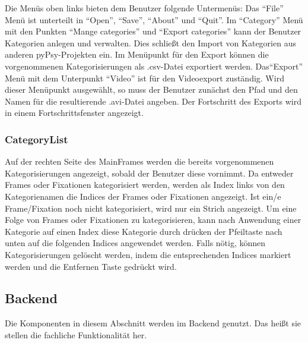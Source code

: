 \documentclass[a4paper,draft]{scrartcl}
\begin{document}
Die Menüs oben links bieten dem Benutzer folgende Untermenüs:
Das "`File"' Menü ist unterteilt in "`Open"', "`Save"', "`About"' und "`Quit"'. 
Im "`Category"' Menü mit den Punkten "`Mange categories"' und "`Export categories"' kann der Benutzer Kategorien anlegen und verwalten. Dies schließt den Import von Kategorien aus anderen pyPsy-Projekten ein.
Im Menüpunkt für den Export können die vorgenommenen Kategorisierungen als .csv-Datei exportiert werden. 
Das"`Export"' Menü mit dem Unterpunkt "`Video"' ist für den Videoexport zuständig. Wird dieser Menüpunkt ausgewählt, so muss der Benutzer zunächst den Pfad und den Namen für die resultierende .avi-Datei angeben. Der Fortschritt des Exports wird in einem Fortschrittsfenster angezeigt.


\subsubsection{CategoryList}
Auf der rechten Seite des MainFrames werden die bereits vorgenommenen Kategorisierungen angezeigt, sobald der Benutzer diese vornimmt. 
Da entweder Frames oder Fixationen kategorisiert werden, werden als Index links von den Kategorienamen die Indices der Frames oder Fixationen angezeigt. Ist ein/e Frame/Fixation noch nicht kategorisiert, wird nur ein Strich angezeigt.
Um eine Folge von Frames oder Fixationen zu kategorisieren, kann nach Anwendung einer Kategorie auf einen Index diese Kategorie durch drücken der Pfeiltaste nach unten auf die folgenden Indices angewendet werden.
Falls nötig, können Kategorisierungen gelöscht werden, indem die entsprechenden Indices markiert werden und die Entfernen Taste gedrückt wird. 

\subsection{Backend}
Die Komponenten in diesem Abschnitt werden im Backend genutzt.
Das hei\ss t sie stellen die fachliche Funktionalit\"at her.
\end{document}

